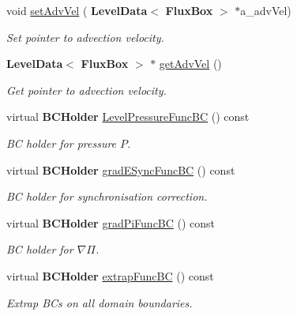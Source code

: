 \begin{DoxyCompactItemize}
void \hyperlink{class_phys_b_c_util_aacb13faac8c92afafe5ddc7d667e6181}{set\+Adv\+Vel} (\textbf{ Level\+Data}$<$ \textbf{ Flux\+Box} $>$ $\ast$a\+\_\+adv\+Vel)
\begin{DoxyCompactList}\small\item\em Set pointer to advection velocity. \end{DoxyCompactList}\item 
\mbox{\label{class_phys_b_c_util_ae121a247bdd5732a82af904ac77257e8}} 
\textbf{ Level\+Data}$<$ \textbf{ Flux\+Box} $>$ $\ast$ \hyperlink{class_phys_b_c_util_ae121a247bdd5732a82af904ac77257e8}{get\+Adv\+Vel} ()
\begin{DoxyCompactList}\small\item\em Get pointer to advection velocity. \end{DoxyCompactList}\item 
virtual \textbf{ B\+C\+Holder} \hyperlink{class_phys_b_c_util_a314c920cf3e0b78c8814d7e3bc020be6}{Level\+Pressure\+Func\+BC} () const
\begin{DoxyCompactList}\small\item\em BC holder for pressure $ P $. \end{DoxyCompactList}\item 
virtual \textbf{ B\+C\+Holder} \hyperlink{class_phys_b_c_util_a111040058c4df423daa036b8555e2bf1}{grad\+E\+Sync\+Func\+BC} () const
\begin{DoxyCompactList}\small\item\em BC holder for synchronisation correction. \end{DoxyCompactList}\item 
\mbox{\label{class_phys_b_c_util_a1dfad0e6bccd8d1f2b82bc55d26c1ce3}} 
virtual \textbf{ B\+C\+Holder} \hyperlink{class_phys_b_c_util_a1dfad0e6bccd8d1f2b82bc55d26c1ce3}{grad\+Pi\+Func\+BC} () const
\begin{DoxyCompactList}\small\item\em BC holder for $ \nabla \Pi $. \end{DoxyCompactList}\item 
\mbox{\label{class_phys_b_c_util_af93ccd3841ed1ed876949f5fb70191df}} 
virtual \textbf{ B\+C\+Holder} \hyperlink{class_phys_b_c_util_af93ccd3841ed1ed876949f5fb70191df}{extrap\+Func\+BC} () const
\begin{DoxyCompactList}\small\item\em Extrap B\+Cs on all domain boundaries. \end{DoxyCompactList}\item 

\end{DoxyCompactItemize}
